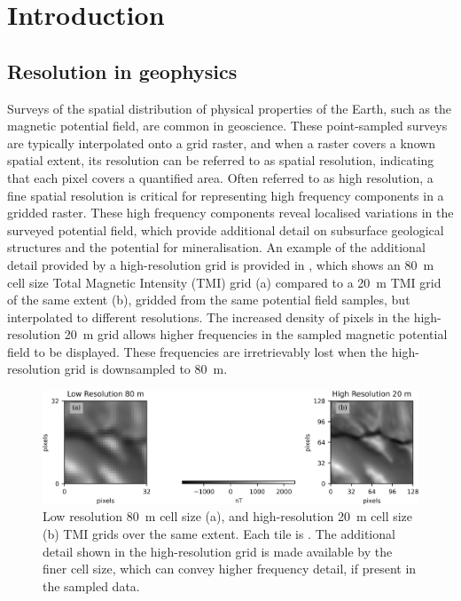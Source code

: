 \documentclass[manuscript.tex]{subfiles}
\begin{document}
\section{Introduction}
\subsection{Resolution in geophysics}
\label{sec:resingeo}
Surveys of the spatial distribution of physical properties of the Earth, such as the magnetic potential field, are common in geoscience.
These point-sampled surveys are typically interpolated onto a grid raster, and when a raster covers a known spatial extent, its resolution can be referred to as spatial resolution, indicating that each pixel covers a quantified area.
Often referred to as high resolution, a fine spatial resolution is critical for representing high frequency components in a gridded raster.
These high frequency components reveal localised variations in the surveyed potential field, which provide additional detail on subsurface geological structures and the potential for mineralisation.
An example of the additional detail provided by a high-resolution grid is provided in , which shows an \qty{80}{\metre} cell size Total Magnetic Intensity (TMI) grid (a) compared to a \qty{20}{\metre} TMI grid of the same  extent (b), gridded from the same potential field samples, but interpolated to different resolutions.
The increased density of pixels in the high-resolution \qty{20}{\metre} grid allows higher frequencies in the sampled magnetic potential field to be displayed.
These frequencies are irretrievably lost when the high-resolution grid is downsampled to \qty{80}{\metre}.

\begin{figure}[hbt]
    \includegraphics[width=\linewidth]{fig/p1/lrandhr.jpg}
    \caption[Comparison of different resolution grids]{Low resolution \qty{80}{\metre} cell size (a), and high-resolution \qty{20}{\metre} cell size (b) TMI grids over the same extent.
        Each tile is .
        The additional detail shown in the high-resolution grid is made available by the finer cell size, which can convey higher frequency detail, if present in the sampled data.}
    \label{fig:lrandhr}
\end{figure}
\end{document}

